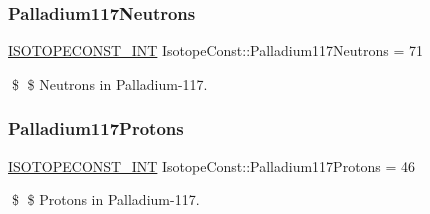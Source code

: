 \subsubsection{\texorpdfstring{Palladium117\+Neutrons}{Palladium117Neutrons}}
{\footnotesize\ttfamily \mbox{\hyperlink{group___isotope_const-_macros_ga5f18360b3e99483a35c32d789e62621c}{I\+S\+O\+T\+O\+P\+E\+C\+O\+N\+S\+T\+\_\+\+I\+NT}} Isotope\+Const\+::\+Palladium117\+Neutrons = 71}

\$ \$ Neutrons in Palladium-\/117. \mbox{\label{group___isotope_const-_palladium-_pd117_gac19ed8e8c164188cd909b6a6df02a374}} 
\subsubsection{\texorpdfstring{Palladium117\+Protons}{Palladium117Protons}}
{\footnotesize\ttfamily \mbox{\hyperlink{group___isotope_const-_macros_ga5f18360b3e99483a35c32d789e62621c}{I\+S\+O\+T\+O\+P\+E\+C\+O\+N\+S\+T\+\_\+\+I\+NT}} Isotope\+Const\+::\+Palladium117\+Protons = 46}

\$ \$ Protons in Palladium-\/117. 